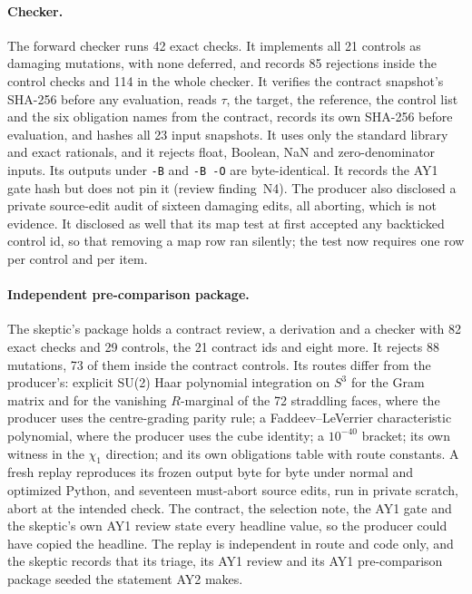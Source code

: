 \paragraph{Checker.}
The forward checker runs 42 exact checks. It implements all 21 controls as
damaging mutations, with none deferred, and records 85 rejections inside the
control checks and 114 in the whole checker. It verifies the contract
snapshot's SHA-256 before any evaluation, reads $\tau$, the target, the
reference, the control list and the six obligation names from the contract,
records its own SHA-256 before evaluation, and hashes all 23 input snapshots.
It uses only the standard library and exact rationals, and it rejects float,
Boolean, NaN and zero-denominator inputs. Its outputs under \texttt{-B} and
\texttt{-B -O} are byte-identical. It records the AY1 gate hash but does not
pin it (review finding~N4). The producer also disclosed a private source-edit
audit of sixteen damaging edits, all aborting, which is not evidence. It
disclosed as well that its map test at first accepted any backticked control
id, so that removing a map row ran silently; the test now requires one row
per control and per item.

\paragraph{Independent pre-comparison package.}
The skeptic's package holds a contract review, a derivation and a checker
with 82 exact checks and 29 controls, the 21 contract ids and eight more. It
rejects 88 mutations, 73 of them inside the contract controls. Its routes
differ from the producer's: explicit SU(2) Haar polynomial integration on
$S^3$ for the Gram matrix and for the vanishing $R$-marginal of the 72
straddling faces, where the producer uses the centre-grading parity rule; a
Faddeev--LeVerrier characteristic polynomial, where the producer uses the
cube identity; a $10^{-40}$ bracket; its own witness in the $\chi_1$
direction; and its own obligations table with route constants. A fresh replay
reproduces its frozen output byte for byte under normal and optimized Python,
and seventeen must-abort source edits, run in private scratch, abort at the
intended check. The contract, the selection note, the AY1 gate and the
skeptic's own AY1 review state every headline value, so the producer could
have copied the headline. The replay is independent in route and code only,
and the skeptic records that its triage, its AY1 review and its AY1
pre-comparison package seeded the statement AY2 makes.

